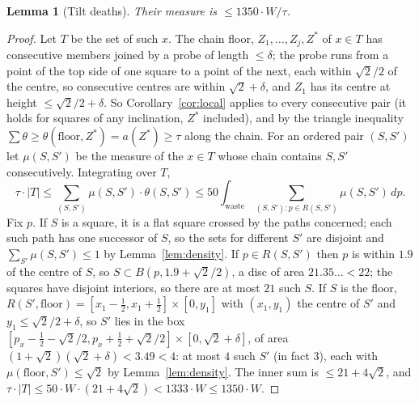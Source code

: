 \documentclass[11pt,letterpaper]{amsart}
\theoremstyle{plain}
\newtheorem{lemma}[theorem]{Lemma}
\theoremstyle{definition}
\theoremstyle{remark}
\begin{document}
\begin{lemma}[Tilt deaths]\label{lem:stilt}
Their measure is $\le1350\cdot W/\tau$.
\end{lemma}
\begin{proof}
Let $T$ be the set of such $x$. The chain floor, $Z_1,\ldots,Z_j,Z^*$ of $x\in T$ has consecutive members joined by a probe of length $\le\delta$; the probe runs from a point of the top side of one square to a point of the next, each within $\sqrt2/2$ of the centre, so consecutive centres are within $\sqrt2+\delta$, and $Z_1$ has its centre at height $\le\sqrt2/2+\delta$. So Corollary~\ref{cor:local} applies to every consecutive pair (it holds for squares of any inclination, $Z^*$ included), and by the triangle inequality $\sum\theta\ge\theta(\text{floor},Z^*)=a(Z^*)\ge\tau$ along the chain. For an ordered pair $(S,S')$ let $\mu(S,S')$ be the measure of the $x\in T$ whose chain contains $S,S'$ consecutively. Integrating over $T$,
\[
\tau\cdot|T|\le\sum_{(S,S')}\mu(S,S')\cdot\theta(S,S')\le50\int_{\text{waste}}\sum_{(S,S'):p\in R(S,S')}\mu(S,S')\,dp.
\]
Fix $p$. If $S$ is a square, it is a flat square crossed by the paths concerned; each such path has one successor of $S$, so the sets for different $S'$ are disjoint and $\sum_{S'}\mu(S,S')\le1$ by Lemma~\ref{lem:density}. If $p\in R(S,S')$ then $p$ is within $1.9$ of the centre of $S$, so $S\subset B(p,1.9+\sqrt2/2)$, a disc of area $21.35\ldots<22$; the squares have disjoint interiors, so there are at most $21$ such $S$. If $S$ is the floor, $R(S',\text{floor})=[x_1-\tfrac12,x_1+\tfrac12]\times[0,y_1]$ with $(x_1,y_1)$ the centre of $S'$ and $y_1\le\sqrt2/2+\delta$, so $S'$ lies in the box $[p_x-\tfrac12-\sqrt2/2,p_x+\tfrac12+\sqrt2/2]\times[0,\sqrt2+\delta]$, of area $(1+\sqrt2)(\sqrt2+\delta)<3.49<4$: at most $4$ such $S'$ (in fact $3$), each with $\mu(\text{floor},S')\le\sqrt2$ by Lemma~\ref{lem:density}. The inner sum is $\le21+4\sqrt2$, and $\tau\cdot|T|\le50\cdot W\cdot(21+4\sqrt2)<1333\cdot W\le1350\cdot W$.
\end{proof}
\end{document}
